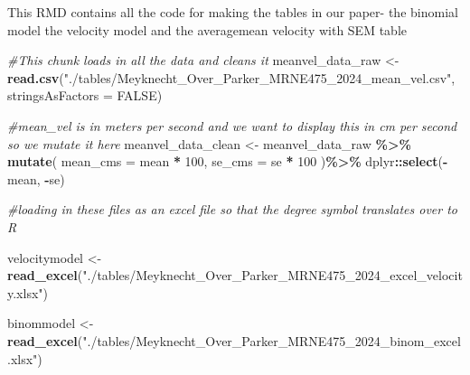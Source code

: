 \documentclass[
]{article}
\author{Fiona Parker}
\date{2024-12-10}
\newenvironment{Shaded}{\begin{snugshade}}{\end{snugshade}}
\newcommand{\AttributeTok}[1]{\textcolor[rgb]{0.13,0.29,0.53}{#1}}
\newcommand{\CommentTok}[1]{\textcolor[rgb]{0.56,0.35,0.01}{\textit{#1}}}
\newcommand{\ConstantTok}[1]{\textcolor[rgb]{0.56,0.35,0.01}{#1}}
\newcommand{\DecValTok}[1]{\textcolor[rgb]{0.00,0.00,0.81}{#1}}
\newcommand{\FunctionTok}[1]{\textcolor[rgb]{0.13,0.29,0.53}{\textbf{#1}}}
\newcommand{\NormalTok}[1]{#1}
\newcommand{\OtherTok}[1]{\textcolor[rgb]{0.56,0.35,0.01}{#1}}
\newcommand{\SpecialCharTok}[1]{\textcolor[rgb]{0.81,0.36,0.00}{\textbf{#1}}}
\newcommand{\StringTok}[1]{\textcolor[rgb]{0.31,0.60,0.02}{#1}}
\begin{document}
This RMD contains all the code for making the tables in our paper- the
binomial model the velocity model and the averagemean velocity with SEM
table

\begin{Shaded}
\begin{Highlighting}[]
\CommentTok{\#This chunk loads in all the data and cleans it}
\NormalTok{meanvel\_data\_raw }\OtherTok{\textless{}{-}} \FunctionTok{read.csv}\NormalTok{(}\StringTok{"./tables/Meyknecht\_Over\_Parker\_MRNE475\_2024\_mean\_vel.csv"}\NormalTok{, }\AttributeTok{stringsAsFactors =} \ConstantTok{FALSE}\NormalTok{)}

\CommentTok{\#mean\_vel is in meters per second and we want to display this in cm per second so we mutate it here}
\NormalTok{meanvel\_data\_clean }\OtherTok{\textless{}{-}}\NormalTok{ meanvel\_data\_raw }\SpecialCharTok{\%\textgreater{}\%}
  \FunctionTok{mutate}\NormalTok{(}
    \AttributeTok{mean\_cms =}\NormalTok{ mean }\SpecialCharTok{*} \DecValTok{100}\NormalTok{,}
    \AttributeTok{se\_cms =}\NormalTok{ se }\SpecialCharTok{*} \DecValTok{100}
\NormalTok{  )}\SpecialCharTok{\%\textgreater{}\%}
\NormalTok{   dplyr}\SpecialCharTok{::}\FunctionTok{select}\NormalTok{(}\SpecialCharTok{{-}}\NormalTok{mean, }\SpecialCharTok{{-}}\NormalTok{se)}

\CommentTok{\#loading in these files as an excel file so that the degree symbol translates over to R}

\NormalTok{velocitymodel }\OtherTok{\textless{}{-}} \FunctionTok{read\_excel}\NormalTok{(}\StringTok{"./tables/Meyknecht\_Over\_Parker\_MRNE475\_2024\_excel\_velocity.xlsx"}\NormalTok{)}

\NormalTok{binommodel }\OtherTok{\textless{}{-}} \FunctionTok{read\_excel}\NormalTok{(}\StringTok{"./tables/Meyknecht\_Over\_Parker\_MRNE475\_2024\_binom\_excel.xlsx"}\NormalTok{) }
\end{Highlighting}
\end{Shaded}
\end{document}
